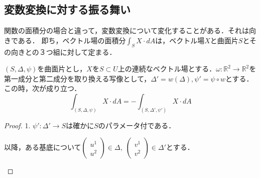 \documentclass[uplatex, dvipdfmx]{jsreport}
\begin{document}
\subsection{変数変換に対する振る舞い}
関数の面積分の場合と違って，変数変換について変化することがある．それは向きである．
即ち，ベクトル場の面積分$\int_S X\cdot dA$は，ベクトル場$X$と曲面片$S$とその向きとの３つ組に対して定まる．

\begin{lemma}
    $(S,\Delta,\psi)$を曲面片とし，$X$を$S\subset U$上の連続なベクトル場とする．$\omega:\mathbb{R}^2\to\mathbb{R}^2$を第一成分と第二成分を取り換える写像として，$\Delta'=w(\Delta), \psi'=\psi\circ w$とする．
    この時，次が成り立つ．
    \[ \int_{(S,\Delta,\psi)}X\cdot dA = -\int_{(S,\Delta',\psi')}X\cdot dA \]
\end{lemma}
\begin{proof}
    1. $\psi':\Delta'\to S$は確かに$S$のパラメータ付である．

    以降，ある基底について$\begin{pmatrix}u^1\\u^2\end{pmatrix}\in\Delta,\; \begin{pmatrix}v^1\\v^2\end{pmatrix}\in\Delta'$とする．

    \begin{center}
    \end{center}


\end{proof}
\end{document}
